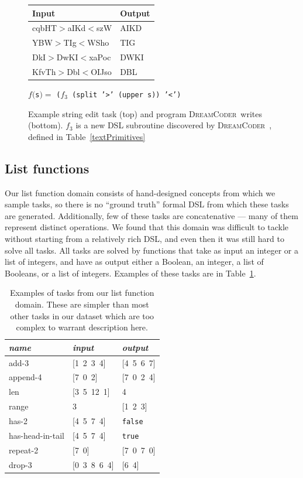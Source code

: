 \documentclass{article}
\newcommand{\system}{\textsc{DreamCoder}~}
\newcommand{\code}[1]{{\footnotesize\texttt{#1}}}
\begin{document}
\begin{figure}
  \centering\begin{tabular}{ll}\toprule
    Input&Output\\\midrule
cqbHT$>$aIKd$<$szW& 	AIKD\\
YBW$>$TIg$<$WSho 	&TIG\\
DkI$>$DwKI$<$xaPoc& 	DWKI\\
KfvTh$>$Dbl$<$OIJso 	&DBL
    \\\bottomrule
  \end{tabular}
  
  \vspace{0.5cm}
  
  \begin{minipage}{7.5cm}
 $f($\code{s}$) = $   \code{(}$f_3$\code{ (split '>' (upper s)) '<')}
    \end{minipage}
  \caption{Example string edit task (top) and program  \system writes (bottom). $f_3$ is a new DSL subroutine discovered by \system, defined in Table~\ref{textPrimitives}}\label{exampleTextProblem}
  \end{figure}

\subsection{List functions}
Our list function domain consists of hand-designed concepts from which we
sample tasks, so there is no ``ground truth'' formal DSL from which these
tasks are generated. Additionally, few of these tasks are concatenative ---
many of them represent distinct operations. We found that this domain was
difficult to tackle without starting from a relatively rich DSL, and even
then it was still hard to solve all tasks. All tasks are solved by functions
that take as input an integer or a list of integers, and have as output
either a Boolean, an integer, a list of Booleans, or a list of integers.
Examples of these tasks are in Table~\ref{listexamples}.

\begin{table}
\centering
\begin{tabular}{| l | l | l |}
  \hline
  \emph{name} & \emph{input} & \emph{output} \\
  \hline
  add-3 & [1\, 2\, 3\, 4] & [4\, 5\, 6\, 7] \\
  append-4 & [7\, 0\, 2] & [7\, 0\, 2\, 4] \\
  len & [3\, 5\, 12\, 1] & 4 \\
  range & 3 & [1\, 2\, 3] \\
  has-2 & [4\, 5\, 7\, 4] & \code{false} \\
  has-head-in-tail & [4\, 5\, 7\, 4] & \code{true} \\
  repeat-2 & [7\, 0] & [7\, 0\, 7\, 0] \\
  drop-3 & [0\, 3\, 8\, 6\, 4] & [6\, 4] \\
  \hline
\end{tabular}
\caption{Examples of tasks from our list function domain. These are simpler
  than most other tasks in our dataset which are too complex to warrant
  description here.}
\label{listexamples}
\end{table}
\end{document}
